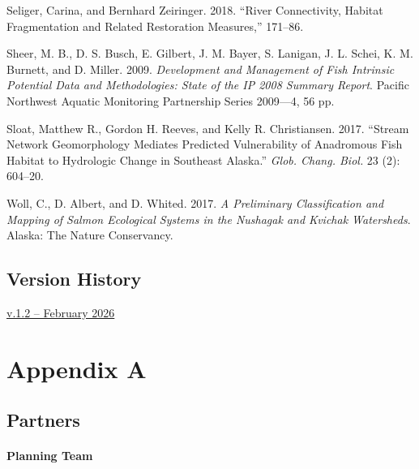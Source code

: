 \documentclass[
  letterpaper,
  DIV=11,
  numbers=noendperiod]{scrreprt}
\newlength{\cslhangindent}
\newlength{\cslentryspacingunit} %
\newenvironment{CSLReferences}[2] %
 {%
  \setlength{\parindent}{0pt}
  \ifodd #1
  \let\oldpar\par
  \def\par{\hangindent=\cslhangindent\oldpar}
  \fi
  \setlength{\parskip}{#2\cslentryspacingunit}
 }%
 {}
\begin{document}
\begin{CSLReferences}{1}{0}
\leavevmode{}%
Seliger, Carina, and Bernhard Zeiringer. 2018. {``River Connectivity,
Habitat Fragmentation and Related Restoration Measures,''} 171--86.

\leavevmode{}%
Sheer, M. B., D. S. Busch, E. Gilbert, J. M. Bayer, S. Lanigan, J. L.
Schei, K. M. Burnett, and D. Miller. 2009. \emph{Development and
Management of Fish Intrinsic Potential Data and Methodologies: State of
the {IP} 2008 Summary Report}. Pacific Northwest Aquatic Monitoring
Partnership Series 2009---4, 56 pp.

\leavevmode{}%
Sloat, Matthew R., Gordon H. Reeves, and Kelly R. Christiansen. 2017.
{``Stream Network Geomorphology Mediates Predicted Vulnerability of
Anadromous Fish Habitat to Hydrologic Change in Southeast Alaska.''}
\emph{Glob. Chang. Biol.} 23 (2): 604--20.

\leavevmode{}%
Woll, C., D. Albert, and D. Whited. 2017. \emph{A Preliminary
Classification and Mapping of Salmon Ecological Systems in the Nushagak
and Kvichak Watersheds}. Alaska: The Nature Conservancy.

\end{CSLReferences}


\hypertarget{version-history}{%
\chapter*{Version History}\label{version-history}}


\href{https://v1-0--horsefly-wcrp-test.netlify.app/}{v.1.2 -- February
2026}

\part{Appendix A}

\hypertarget{partners}{%
\chapter*{Partners}\label{partners}}


\hypertarget{planning-team}{%
\subsection*{Planning Team}\label{planning-team}}
\end{document}
